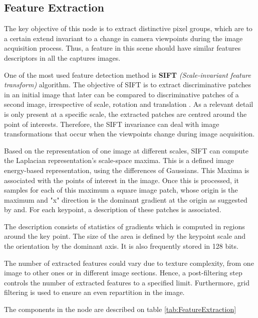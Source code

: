 \documentclass[12pt]{report}
\begin{document}
\newpage
  \subsection{Feature Extraction}
  The key objective of this node is to extract distinctive pixel groups, which are to a certain extend invariant to a change in camera viewpoints during the image acquisition process.
  Thus, a feature in this scene should have similar features descriptors in all the captures images.
  
  One of the most used feature detection method is \textbf{SIFT} \textit{(Scale-invariant feature transform)} algorithm. 
  The objective of SIFT is to extract discriminative patches in an initial image that later can be compared to discriminative patches of a second image, irrespective of scale, rotation and translation .
  As a relevant detail is only present at a specific scale, the extracted patches are centred around the point of interests. 
  Therefore, the SIFT invariance can deal with image transformations that occur when the viewpoints change during image acquisition.
  
  Based on the representation of one image at different scales, SIFT can compute the  Laplacian representation's scale-space maxima. This is a defined image energy-based representation, using the differences of Gaussians.
  This Maxima is associated with the points of interest in the image. 
  Once this is processed, it samples for each of this maximum a square image patch, whose origin is the maximum and "x" direction is the dominant gradient at the origin as suggested by  and.
  For each keypoint, a description of these patches is associated. 
  
  The description consists of statistics of gradients which is computed in regions around the key point. The size of the area is defined by the keypoint scale and the orientation by the dominant axis.
   It is also frequently stored in 128 bits.
   \enlargethispage{\baselineskip}
  
  The number of extracted features could vary due to texture complexity, from one image to other ones or in different image sections. Hence, a post-filtering step controls the number of extracted features to a specified limit. 
  Furthermore, grid filtering is used to ensure an even repartition in the image.
  
  The components in the node are described on table \ref{tab:FeatureExtraction}
  
\end{document}
